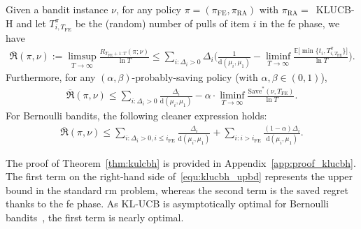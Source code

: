 \documentclass[twoside,11pt]{article}
\newcommand{\rmd}{\mathrm{d}}
\newcommand{\bbE}{\mathbb{E}}
\newcommand{\Tfe}{T_{\mathrm{FE}}}
\newcommand{\Saved}{\mathrm{Save}}
\newcommand{\ife}{i_{\mathrm{FE}}}
\newcommand{\FE}{\textrm{FE}}
\newcommand{\RA}{\textrm{RA}}
\newcommand{\klucbh}{\textsc{KLUCB-H}}
\begin{document}
\begin{theorem}\label{thm:kulcbh}
    Given a bandit instance $\nu$,
    for any policy $\pi=(\pi_{\FE},\pi_{\RA})$ with $\pi_{\RA}=$\ \klucbh{} and
    let $T_{i,\Tfe}^\pi$ be the (random) number of pulls of item $i$ in the \ac{fe} phase, we have %
    \begin{align}\label{equ:klucbh_upbd}
      \!\!\!\!\overline{\mathfrak{R}}(\pi,\nu)\!:=\!\limsup_{T\to\infty}  \frac{R_{\Tfe+1:T} (\pi;\nu )}{\ln T}
        \!\le\!\sum_{i:\Delta_i>0} \!
          \Delta_{i}
             \bigg(
               \frac{1}{\rmd(\mu_i,\mu_1)}
               \!-\!
                \liminf_{T\to\infty}\frac{\bbE\big[\min\{t_i,T_{i,\Tfe}^\pi\} \big]}{\ln T}
             \bigg).
    \end{align}
    Furthermore, for any $(\alpha,\beta)$-probably-saving policy (with $\alpha,\beta\in (0,1)$), 
    \begin{align}\label{equ:klucbh_upbd_ab}
       \overline{\mathfrak{R}}(\pi,\nu)\le \sum_{i:\Delta_i>0} 
               \frac{\Delta_{i}}{\rmd(\mu_i,\mu_1)}
               -
                \alpha\cdot\liminf_{T\to\infty}\frac{\Saved^*(\nu,\Tfe)}{\ln T}.
    \end{align}
    For Bernoulli bandits, the following cleaner expression holds: %
    \begin{align}
         \overline{\mathfrak{R}}(\pi,\nu)\le\sum_{i:\Delta_i>0,i\leq\ife} 
           \frac{\Delta_{i}}{\rmd(\mu_i,\mu_1)}
           +
           \sum_{i:i>\ife} 
           \frac{(1-\alpha)\Delta_{i}}{\rmd(\mu_i,\mu_1)} .
    \end{align}
\end{theorem}
The proof of Theorem~\ref{thm:kulcbh} is provided in Appendix~\ref{app:proof_klucbh}.
The first term on the right-hand side of~\eqref{equ:klucbh_upbd} represents the upper bound in the standard \ac{rm} problem, whereas the second term is the saved regret thanks to the \ac{fe} phase. As \textsc{KL-UCB}  is asymptotically optimal for Bernoulli bandits~\citep{garivier2011KLUCB}, the first term is nearly optimal. 
\end{document}
